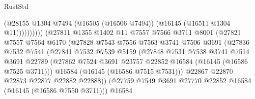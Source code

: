 \begin{lexlean}{RustStd}
\begin{coremodule}
                                        (@28155
                                          @1304
                                          @7494
                                          (@16505 (@16506 @7494))
                                          (@16145 (@16511 @1304 @11))))))))))
                          (@27811
                            @1355
                            @1402
                            @11
                            @7557
                            @7566
                            @3711
                            @8001
                            (@27821
                              @7557
                              @7564
                              @6170
                              (@27828
                                @7543
                                @7556
                                @7563
                                @3741
                                @7506
                                @3691
                                (@27836
                                  @7532
                                  @7541
                                  (@27841
                                    @7532
                                    @7539
                                    @5159
                                    (@27848
                                      @7531
                                      @7538
                                      @3741
                                      @7514
                                      @3691
                                      @22789
                                      (@27862
                                        @7524
                                        @3691
                                        @23757
                                        @22852
                                        @16584
                                        (@16145 (@16586 @7525 @3711)))
                                      @16584
                                      (@16145 (@16586 @7515 @7531)))
                                    @22867
                                    @22870
                                    @22873
                                    @22877
                                    @22882
                                    @22888))
                                (@27759
                                  @7549
                                  @3691
                                  @27770
                                  @22852
                                  @16584
                                  (@16145 (@16586 @7550 @3711)))
                                @16584

\end{coremodule}
\end{lexlean}
